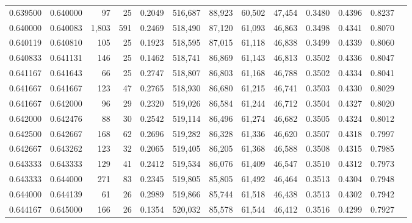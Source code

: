 \begin{tabular}{rrrrrrrrrrrrr}
0.639500 & 0.640000 &    97 &  25 &                                     0.2049 & 516,687 &  88,923 &  60,502 &  47,454 & 0.3480 & 0.4396 & 0.8237 \\
0.640000 & 0.640083 & 1,803 & 591 &                                     0.2469 & 518,490 &  87,120 &  61,093 &  46,863 & 0.3498 & 0.4341 & 0.8070 \\
0.640119 & 0.640810 &   105 &  25 &                                     0.1923 & 518,595 &  87,015 &  61,118 &  46,838 & 0.3499 & 0.4339 & 0.8060 \\
0.640833 & 0.641131 &   146 &  25 &                                     0.1462 & 518,741 &  86,869 &  61,143 &  46,813 & 0.3502 & 0.4336 & 0.8047 \\
0.641167 & 0.641643 &    66 &  25 &                                     0.2747 & 518,807 &  86,803 &  61,168 &  46,788 & 0.3502 & 0.4334 & 0.8041 \\
0.641667 & 0.641667 &   123 &  47 &                                     0.2765 & 518,930 &  86,680 &  61,215 &  46,741 & 0.3503 & 0.4330 & 0.8029 \\
0.641667 & 0.642000 &    96 &  29 &                                     0.2320 & 519,026 &  86,584 &  61,244 &  46,712 & 0.3504 & 0.4327 & 0.8020 \\
0.642000 & 0.642476 &    88 &  30 &                                     0.2542 & 519,114 &  86,496 &  61,274 &  46,682 & 0.3505 & 0.4324 & 0.8012 \\
0.642500 & 0.642667 &   168 &  62 &                                     0.2696 & 519,282 &  86,328 &  61,336 &  46,620 & 0.3507 & 0.4318 & 0.7997 \\
0.642667 & 0.643262 &   123 &  32 &                                     0.2065 & 519,405 &  86,205 &  61,368 &  46,588 & 0.3508 & 0.4315 & 0.7985 \\
0.643333 & 0.643333 &   129 &  41 &                                     0.2412 & 519,534 &  86,076 &  61,409 &  46,547 & 0.3510 & 0.4312 & 0.7973 \\
0.643333 & 0.644000 &   271 &  83 &                                     0.2345 & 519,805 &  85,805 &  61,492 &  46,464 & 0.3513 & 0.4304 & 0.7948 \\
0.644000 & 0.644139 &    61 &  26 &                                     0.2989 & 519,866 &  85,744 &  61,518 &  46,438 & 0.3513 & 0.4302 & 0.7942 \\
0.644167 & 0.645000 &   166 &  26 &                                     0.1354 & 520,032 &  85,578 &  61,544 &  46,412 & 0.3516 & 0.4299 & 0.7927 \\

\end{tabular}
